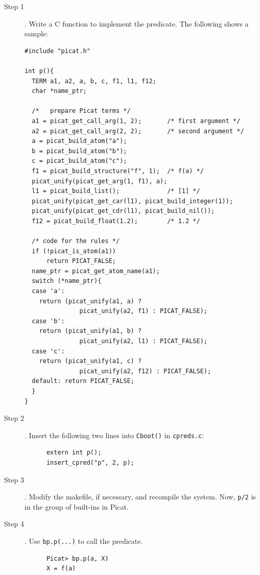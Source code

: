 \begin{description}
\item [Step 1]. Write a C function to implement the predicate. The following shows a sample:
\begin{verbatim}
#include "picat.h"

int p(){
  TERM a1, a2, a, b, c, f1, l1, f12;
  char *name_ptr;
  
  /*   prepare Picat terms */
  a1 = picat_get_call_arg(1, 2);       /* first argument */
  a2 = picat_get_call_arg(2, 2);       /* second argument */
  a = picat_build_atom("a");
  b = picat_build_atom("b");
  c = picat_build_atom("c");
  f1 = picat_build_structure("f", 1);  /* f(a) */
  picat_unify(picat_get_arg(1, f1), a);
  l1 = picat_build_list();             /* [1] */ 
  picat_unify(picat_get_car(l1), picat_build_integer(1));
  picat_unify(picat_get_cdr(l1), picat_build_nil());
  f12 = picat_build_float(1.2);        /* 1.2 */
  
  /* code for the rules */
  if (!picat_is_atom(a1)) 
      return PICAT_FALSE;
  name_ptr = picat_get_atom_name(a1);
  switch (*name_ptr){
  case 'a': 
    return (picat_unify(a1, a) ? 
               picat_unify(a2, f1) : PICAT_FALSE);
  case 'b': 
    return (picat_unify(a1, b) ? 
               picat_unify(a2, l1) : PICAT_FALSE);
  case 'c': 
    return (picat_unify(a1, c) ? 
               picat_unify(a2, f12) : PICAT_FALSE);
  default: return PICAT_FALSE;
  }
}
\end{verbatim}

\item [Step 2]. Insert the following two lines into \texttt{Cboot()} in \texttt{cpreds.c}:
\begin{verbatim}
      extern int p();
      insert_cpred("p", 2, p);
\end{verbatim}
\item [Step 3]. Modify the makefile, if necessary, and recompile the system. Now, \texttt{p/2} is in the group of built-ins in Picat.

\item [Step 4]. Use \texttt{bp.p(...)} to call the predicate.
\begin{verbatim}
      Picat> bp.p(a, X)
      X = f(a)
\end{verbatim}

\end{description}

